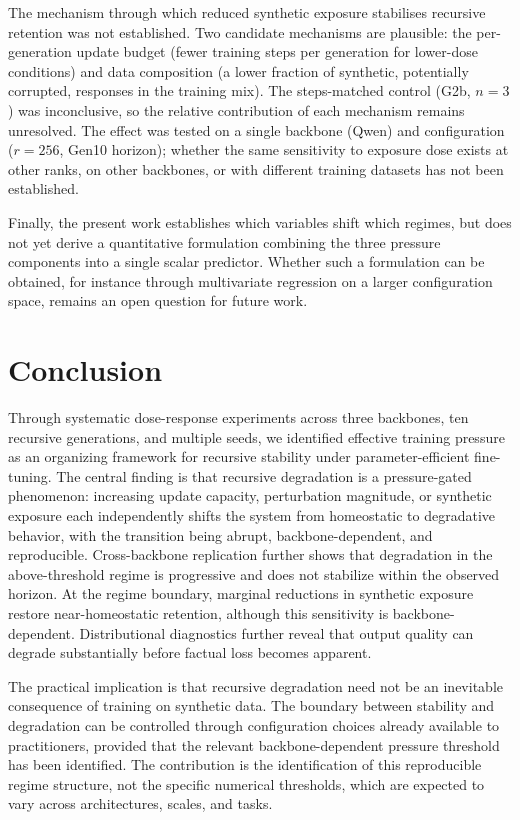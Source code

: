 \documentclass[a4paper,fleqn]{cas-dc}
\newif\ifshowchanges
\newcommand{\rev}[1]{\ifshowchanges{\color{blue}#1}\else{#1}\fi}
\begin{document}
\rev{The mechanism through which reduced synthetic exposure stabilises
recursive retention was not established. Two candidate mechanisms are
plausible: the per-generation update budget (fewer training steps per
generation for lower-dose conditions) and data composition (a lower fraction
of synthetic, potentially corrupted, responses in the training mix). The
steps-matched control (G2b, $n=3$) was inconclusive, so the
relative contribution of each mechanism remains unresolved. The effect
was tested on a single backbone (Qwen) and configuration ($r=256$, Gen10
horizon); whether the same sensitivity to exposure dose exists at other
ranks, on other backbones, or with different training datasets
has not been established.}

Finally, the present work establishes which variables shift which regimes,
but does not yet derive a quantitative formulation combining the three pressure
components into a single scalar predictor. Whether such a formulation can be
obtained, for instance through multivariate regression on a larger configuration
space, remains an open question for future work.

\section{Conclusion}\label{sec:conclusion}

Through systematic dose-response experiments across three backbones, ten
recursive generations, and multiple seeds, we identified effective training
pressure as an organizing framework for recursive stability under
parameter-efficient fine-tuning. The central finding is that recursive
degradation is a pressure-gated phenomenon: increasing update capacity,
perturbation magnitude, or synthetic exposure each independently shifts the
system from homeostatic to degradative behavior, with the transition being
abrupt, backbone-dependent, and reproducible. Cross-backbone replication further
shows that degradation in the above-threshold regime is progressive and does not
stabilize within the observed horizon. At the regime boundary, marginal
reductions in synthetic exposure restore near-homeostatic retention, although
this sensitivity is backbone-dependent. Distributional diagnostics further reveal
that output quality can degrade substantially before factual loss becomes
apparent.

The practical implication is that recursive degradation need not be an
inevitable consequence of training on synthetic data. The boundary between
stability and degradation can be controlled through configuration choices
already available to practitioners, provided that the relevant
backbone-dependent pressure threshold has been identified. The contribution is
the identification of this reproducible regime structure, not the specific
numerical thresholds, which are expected to vary across architectures, scales,
and tasks.
\end{document}
